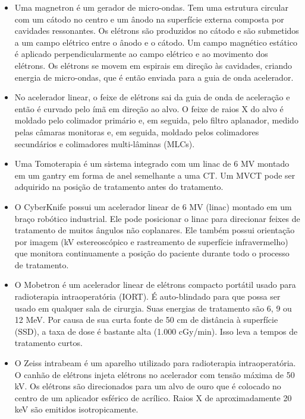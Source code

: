 \documentclass[11pt,a4paper]{article}
\newcounter{exemplo}
\begin{document}
\begin{exemplo}
\begin{itemize}
		\item Uma magnetron é um gerador de micro-ondas. Tem uma estrutura circular com um cátodo no centro e um ânodo na superfície externa composta por cavidades ressonantes. Os elétrons são produzidos no cátodo e são submetidos a um campo elétrico entre o ânodo e o cátodo. Um campo magnético estático é aplicado perpendicularmente ao campo elétrico e ao movimento dos elétrons. Os elétrons se movem em espirais em direção às cavidades, criando energia de micro-ondas, que é então enviada para a guia de onda acelerador.
		
		\item No acelerador linear, o feixe de elétrons sai da guia de onda de aceleração e então é curvado pelo ímã em direção ao alvo. O feixe de raios X do alvo é moldado pelo colimador primário e, em seguida, pelo filtro aplanador, medido pelas câmaras monitoras e, em seguida, moldado pelos colimadores secundários e colimadores multi-lâminas (MLCs).
		
		\item Uma Tomoterapia é um sistema integrado com um linac de 6 MV montado em um gantry em forma de anel semelhante a uma CT. Um MVCT pode ser adquirido na posição de tratamento antes do tratamento.
		
		\item O CyberKnife possui um acelerador linear de 6 MV (linac) montado em um braço robótico industrial. Ele pode posicionar o linac para direcionar feixes de tratamento de muitos ângulos não coplanares. Ele também possui orientação por imagem (kV estereoscópico e rastreamento de superfície infravermelho) que monitora continuamente a posição do paciente durante todo o processo de tratamento.
		
		\item O Mobetron é um acelerador linear de elétrons compacto portátil usado para radioterapia intraoperatória (IORT). É auto-blindado para que possa ser usado em qualquer sala de cirurgia. Suas energias de tratamento são 6, 9 ou 12 MeV. Por causa de sua curta fonte de 50 cm de distância à superfície (SSD), a taxa de dose é bastante alta (1.000 cGy/min). Isso leva a tempos de tratamento curtos.
		
		\item O Zeiss intrabeam é um aparelho utilizado para radioterapia intraoperatória. O canhão de elétrons injeta elétrons no acelerador com tensão máxima de 50 kV. Os elétrons são direcionados para um alvo de ouro que é colocado no centro de um aplicador esférico de acrílico. Raios X de aproximadamente 20 keV são emitidos isotropicamente.
		

\end{itemize}
\end{exemplo}
\end{document}
